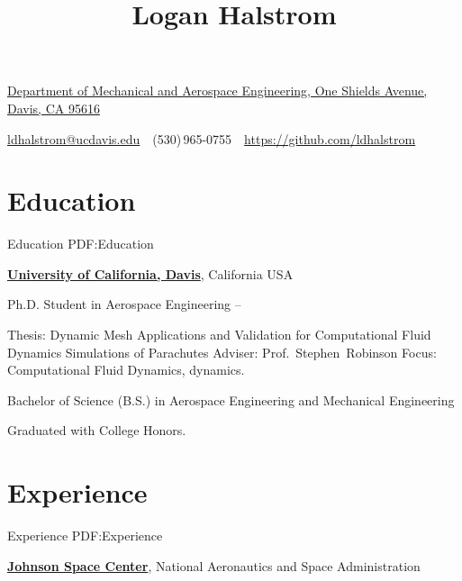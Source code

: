 \documentclass[letterpaper,MMMyyyy,nonstop]{simpleresumecv}
\newcommand{\CVAuthor}{Logan Halstrom}
\newcommand{\CVWebpage}{https://github.com/ldhalstrom}
\begin{document}

\title{\CVAuthor}

\begin{subtitle}
\href{https://www.google.com/maps/place/1+Shields+Ave,+Davis,+CA+95616}
{Department of Mechanical and Aerospace Engineering, One Shields Avenue, Davis, CA 95616}
\par
\href{mailto:ldhalstrom@ucdavis.edu}
{ldhalstrom@ucdavis.edu}
\,\SubBulletSymbol\,
(530)\,965-0755
\,\SubBulletSymbol\,
\href{\CVWebpage}
{\CVWebpage}
\end{subtitle}

\begin{body}


\section
{Education}
{Education}
{PDF:Education}

\href{http://mae.ucdavis.edu/}
{\textbf{University of California, Davis}},
California USA

\GapNoBreak
\BulletItem
Ph.D. Student in
{Aerospace Engineering}
\hfill
{} --
\begin{detail}
\SubBulletItem
Thesis:
{Dynamic Mesh Applications and Validation for Computational Fluid Dynamics Simulations of Parachutes}
\SubBulletItem
Adviser:
Prof.~Stephen~Robinson
\SubBulletItem
Focus:
Computational Fluid Dynamics, dynamics.
\end{detail}

\GapNoBreak
\BulletItem
Bachelor of Science (B.S.) in
{Aerospace Engineering and Mechanical Engineering}
\hfill
{}
\begin{detail}
\SubBulletItem
Graduated with College Honors.
\end{detail}


\section
{Experience}
{Experience}
{PDF:Experience}

\href{https://www.nasa.gov/centers/johnson/home/index.html}
{\textbf{Johnson Space Center}},
National Aeronautics and Space Administration


\end{body}
\end{document}
